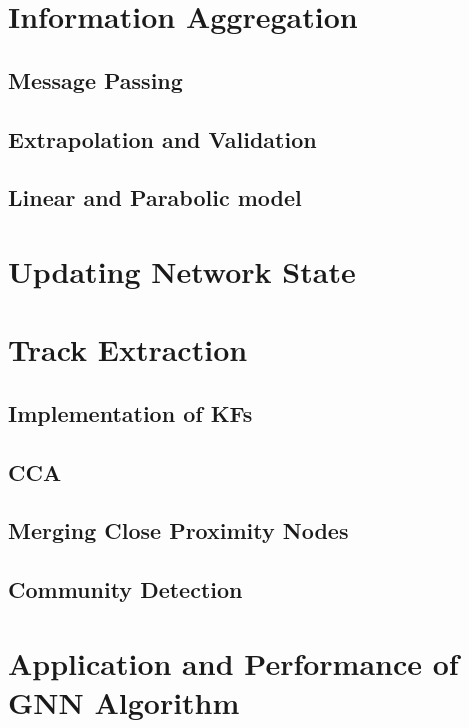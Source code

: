 \section{Information Aggregation}
\subsection{Message Passing}
\subsection{Extrapolation and Validation}
\subsection{Linear and Parabolic model}

\section{Updating Network State}

\section{Track Extraction}
\subsection{Implementation of KFs}
\subsection{CCA}
\subsection{Merging Close Proximity Nodes}
\subsection{Community Detection}



\section{Application and Performance of GNN Algorithm}
\label{chapter-gnn}

